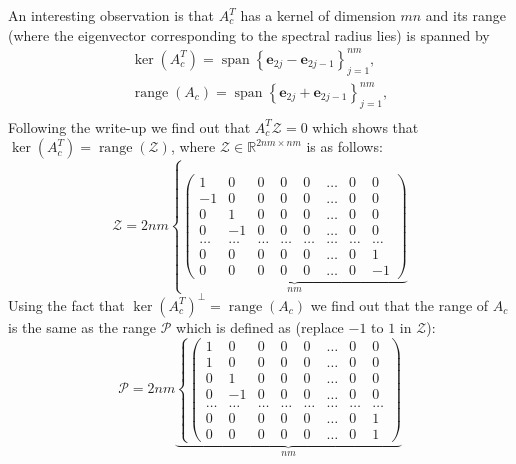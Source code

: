 \documentclass[12pt]{amsart}
\theoremstyle{definition}
\begin{document}
An interesting observation is that 
$A_c^T$ has a kernel of dimension $mn$ and its range (where the eigenvector corresponding to the spectral radius lies) is spanned by 
\begin{equation}
  \begin{aligned}
    \operatorname{ker}(A_c^T)=\operatorname{span}\left\{\bm e_{2j}-\bm e_{2j-1}\right\}_{j=1}^{nm},\\
    \operatorname{range}(A_c)=\operatorname{span}\left\{\bm e_{2j}+\bm e_{2j-1}\right\}_{j=1}^{nm},\\  
  \end{aligned}
\end{equation}
Following the write-up we find out that $A_c^T\mathscr{Z}=0$ which shows that $\operatorname{ker}(A_c^T)=\operatorname{range}(\mathscr{Z})$, where $\mathscr{Z}\in\mathds{R}^{2nm\times nm}$ is as follows: 
\begin{equation}\label{ker-ac}
  \mathscr{Z}=2nm\left\{\underbrace{\begin{pmatrix}
      1 & 0 & 0& 0& 0 & \ldots & 0 & 0\\
     -1 & 0 & 0& 0& 0 & \ldots & 0 & 0\\
      0 & 1 & 0& 0& 0 & \ldots & 0 & 0\\
      0 &-1 & 0& 0& 0 & \ldots & 0 & 0\\
     \ldots & \ldots & \ldots& \ldots& \ldots & \ldots & \ldots & \ldots\\
      0 & 0 & 0& 0& 0 & \ldots & 0 & 1\\
      0 & 0 & 0& 0& 0 & \ldots & 0 & -1
    \end{pmatrix}}_{nm}\right.
  \end{equation}
Using the fact that $\operatorname{ker}(A^T_c)^{\perp}=\operatorname{range}(A_c)$ we find out that the range of $A_c$ is the same as the range $\mathscr{P}$ which is defined as (replace $-1$ to $1$ in $\mathscr{Z}$):
\begin{equation}\label{ran-ac}
  \mathscr{P}=2nm\underbrace{\left\{
    \begin{pmatrix}
      1 & 0 & 0& 0& 0 & \ldots & 0 & 0\\
      1 & 0 & 0& 0& 0 & \ldots & 0 & 0\\
      0 & 1 & 0& 0& 0 & \ldots & 0 & 0\\
      0 &-1 & 0& 0& 0 & \ldots & 0 & 0\\
     \ldots & \ldots & \ldots& \ldots& \ldots & \ldots & \ldots & \ldots\\
      0 & 0 & 0& 0& 0 & \ldots & 0 & 1\\
      0 & 0 & 0& 0& 0 & \ldots & 0 & 1
    \end{pmatrix}\right.}_{nm}
  \end{equation}
\end{document}
